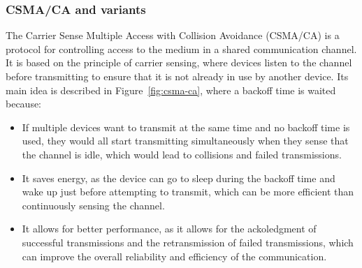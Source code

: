\subsubsection{CSMA/CA and variants}


The Carrier Sense Multiple Access with Collision Avoidance (CSMA/CA) is a protocol for controlling access to the medium in a shared communication channel. It is based on the principle of carrier sensing, where devices listen to the channel before transmitting to ensure that it is not already in use by another device. Its main idea is described in Figure~\ref{fig:csma-ca}, where a backoff time is waited because:
\begin{itemize}
    \item If multiple devices want to transmit at the same time and no backoff time is used, they would all start transmitting simultaneously when they sense that the channel is idle, which would lead to collisions and failed transmissions.
    \item It saves energy, as the device can go to sleep during the backoff time and wake up just before attempting to transmit, which can be more efficient than continuously sensing the channel.
    \item It allows for better performance, as it allows for the ackoledgment of successful transmissions and the retransmission of failed transmissions, which can improve the overall reliability and efficiency of the communication.
\end{itemize}

